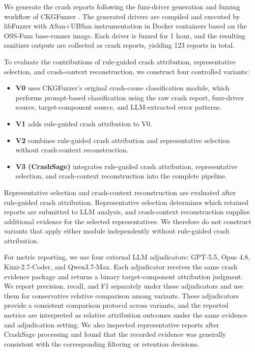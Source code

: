 \documentclass[pdflatex,sn-basic]{sn-jnl}%
\theoremstyle{thmstyleone}%
\theoremstyle{thmstyletwo}%
\theoremstyle{thmstylethree}%
\begin{document}
We generate the crash reports following the fuzz-driver generation and fuzzing workflow of CKGFuzzer \citep{ref12}. The generated drivers are compiled and executed by libFuzzer with ASan+UBSan instrumentation in Docker containers based on the OSS-Fuzz base-runner image. Each driver is fuzzed for 1 hour, and the resulting sanitizer outputs are collected as crash reports, yielding 123 reports in total.

To evaluate the contributions of rule-guided crash attribution, representative selection, and crash-context reconstruction, we construct four controlled variants:
\begin{itemize}
    \item \textbf{V0} uses CKGFuzzer's original crash-cause classification module, which performs prompt-based classification using the raw crash report, fuzz-driver source, target-component source, and LLM-extracted error patterns.
    \item \textbf{V1} adds rule-guided crash attribution to V0.
    \item \textbf{V2} combines rule-guided crash attribution and representative selection without crash-context reconstruction.
    \item \textbf{V3 (CrashSage)} integrates rule-guided crash attribution, representative selection, and crash-context reconstruction into the complete pipeline.
\end{itemize}
Representative selection and crash-context reconstruction are evaluated after rule-guided crash attribution. Representative selection determines which retained reports are submitted to LLM analysis, and crash-context reconstruction supplies additional evidence for the selected representatives. We therefore do not construct variants that apply either module independently without rule-guided crash attribution.

For metric reporting, we use four external LLM adjudicators: GPT-5.5, Opus 4.8, Kimi-2.7-Coder, and Qwen3.7-Max. Each adjudicator receives the same crash evidence package and returns a binary target-component attribution judgment. We report precision, recall, and F1 separately under these adjudicators and use them for conservative relative comparison among variants. These adjudicators provide a consistent comparison protocol across variants, and the reported metrics are interpreted as relative attribution outcomes under the same evidence and adjudication setting. We also inspected representative reports after CrashSage processing and found that the recorded evidence was generally consistent with the corresponding filtering or retention decisions.
\end{document}
